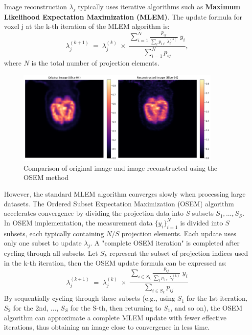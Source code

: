 \documentclass[
reprint,
superscriptaddress,
nofootinbib,
amsmath,amssymb,
aps,
prd,
]{revtex4-2}
\begin{document}
Image reconstruction $\lambda_j$ typically uses iterative algorithms such as \textbf{Maximum Likelihood Expectation Maximization (MLEM)}. The update formula for voxel j at the k-th iteration of the MLEM algorithm is:
\begin{equation}
    \lambda_j^{(k+1)}
    \;=\;
    \lambda_j^{(k)}
    \;\times\;
    \frac{\displaystyle \sum_{i=1}^{N} \frac{p_{ij}}{\sum_{\ell} p_{i\ell}\,\lambda_{\ell}^{(k)}} \; y_i}
    {\displaystyle \sum_{i=1}^{N} p_{ij}}  ,
\end{equation}
where $N$ is the total number of projection elements.

\begin{figure}[htbp]
    \centering
    \vspace{-0.2cm}
    \includegraphics[width=0.9\textwidth]{Images/output}
    \vspace{-0.2cm}
    \caption{Comparison of original image and image reconstructed using the OSEM method}
    \vspace{-0.2cm}
    \label{fig:pet_reconstruction}
\end{figure}

However, the standard MLEM algorithm converges slowly when processing large datasets. The Ordered Subset Expectation Maximization (OSEM) algorithm accelerates convergence by dividing the projection data into $S$ subsets $S_1,\dots,S_S$. In OSEM implementation, the measurement data $\{y_i\}_{i=1}^N$ is divided into $S$ subsets, each typically containing $N/S$ projection elements. Each update uses only one subset to update $\lambda_j$. A "complete OSEM iteration" is completed after cycling through all subsets.
Let $S_k$ represent the subset of projection indices used in the k-th iteration, then the OSEM update formula can be expressed as:
\begin{equation}
    \lambda_j^{(k+1)}
\;=\;
\lambda_j^{(k)}
\;\times\;
\frac{\displaystyle \sum_{i \in S_{k}} \frac{p_{ij}}{\sum_{\ell} p_{i\ell}\,\lambda_{\ell}^{(k)}} \; y_i}
{\displaystyle \sum_{i \in S_{k}} p_{ij}}
\end{equation}
By sequentially cycling through these subsets (e.g., using $S_1$ for the 1st iteration, $S_2$ for the 2nd, ..., $S_S$ for the S-th, then returning to $S_1$, and so on), the OSEM algorithm can approximate a complete MLEM update with fewer effective iterations, thus obtaining an image close to convergence in less time.
\end{document}
